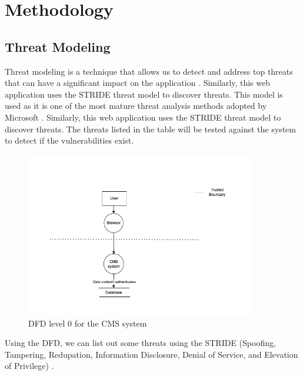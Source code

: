 \chapter{Methodology}
\section{Threat Modeling}
Threat modeling is a technique that allows us to detect and address top threats that can have a significant impact on the application \citep{threat_modeling}. Similarly, this web application uses the STRIDE threat model to discover threats. This model is used as it is one of the most mature threat analysis methods adopted by Microsoft \citep[p.~1]{shevchenko2018threat}. Similarly, this web application uses the STRIDE threat model to discover threats. The threats listed in the table will be tested against the system to detect if the vulnerabilities exist.

\begin{figure}[h!]
\centering
\includegraphics[width=380px]{pics/dfd.png}
\caption{DFD level 0 for the CMS system}\label{fig:dfd}
\end{figure}

Using the DFD, we can list out some threats using the STRIDE (Spoofing, Tampering, Redupation, Information Disclosure, Denial of Service, and Elevation of Privilege) \citep[p.~2]{stride}.

